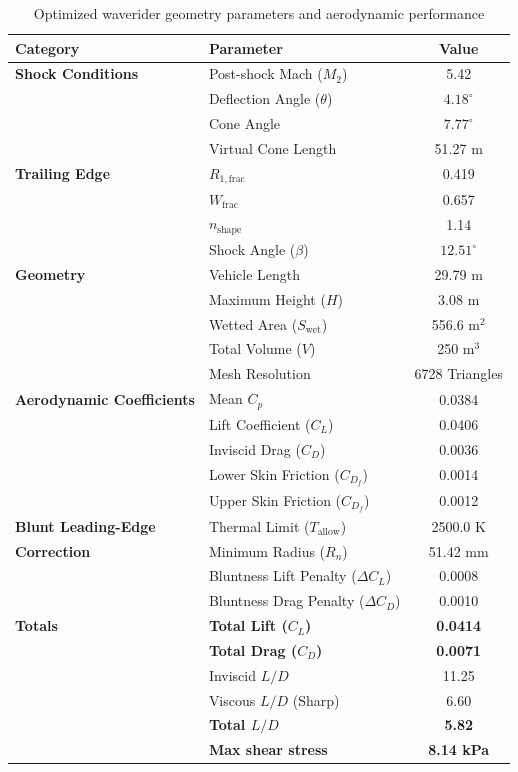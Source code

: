 \documentclass[10pt,a4paper]{article}
\begin{document}
\begin{table}[htbp!]
    \centering
    \caption{Optimized waverider geometry parameters and aerodynamic performance}
    \label{tab:optimized_results}
    \begin{tabular}{@{}llc@{}}
        \toprule
        \textbf{Category} & \textbf{Parameter} & \textbf{Value} \\
        \midrule
        \textbf{Shock Conditions} 
        & Post-shock Mach ($M_2$) & 5.42 \\
        & Deflection Angle ($\theta$) & $4.18^\circ$ \\
        & Cone Angle & $7.77^\circ$ \\
        & Virtual Cone Length & 51.27 m \\
        \midrule
        \textbf{Trailing Edge} 
        & $R_{1, \text{frac}}$ & 0.419 \\
        & $W_\text{frac}$ & 0.657 \\
        & $n_{\text{shape}}$ & 1.14 \\
        & Shock Angle ($\beta$) & $12.51^\circ$ \\
        \midrule
        \textbf{Geometry} 
        & Vehicle Length & 29.79 m \\
        & Maximum Height ($H$) & 3.08 m \\
        & Wetted Area ($S_{\text{wet}}$) & 556.6 m$^2$ \\
        & Total Volume ($V$) & 250 m$^3$ \\
        & Mesh Resolution & 6728 Triangles \\
        \midrule
        \textbf{Aerodynamic Coefficients} 
        & Mean $C_p$ & 0.0384 \\
        & Lift Coefficient ($C_L$) & 0.0406 \\
        & Inviscid Drag ($C_D$) & 0.0036 \\
        & Lower Skin Friction ($C_{D_f}$) & 0.0014 \\
        & Upper Skin Friction ($C_{D_f}$) & 0.0012 \\
        \midrule
        \textbf{Blunt Leading-Edge} 
        & Thermal Limit ($T_{\text{allow}}$) & 2500.0 K \\
        \textbf{Correction} & Minimum Radius ($R_n$) & 51.42 mm \\
        & Bluntness Lift Penalty ($\Delta C_L$) & 0.0008 \\
        & Bluntness Drag Penalty ($\Delta C_D$) & 0.0010 \\
        \midrule
        \textbf{Totals} 
        & \textbf{Total Lift ($C_L$)} & \textbf{0.0414} \\
        & \textbf{Total Drag ($C_D$)} & \textbf{0.0071} \\
        & Inviscid $L/D$ & 11.25\\
        & Viscous $L/D$ (Sharp) & 6.60 \\
        & \textbf{Total $L/D$} & \textbf{5.82} \\
        & \textbf{Max shear stress} & \textbf{8.14 kPa} \\
        \bottomrule
    \end{tabular}
\end{table}
\end{document}
